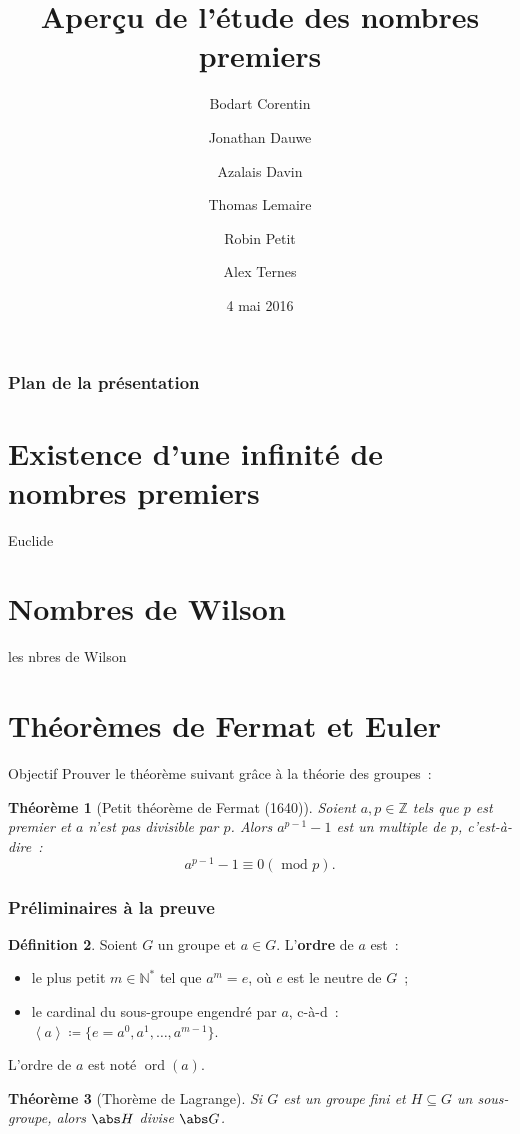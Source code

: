 \documentclass[10pt, mathserif]{beamer}
\title{Aperçu de l'étude des nombres premiers}
\author{Bodart Corentin %
	\and Jonathan Dauwe %
	\and Azalais Davin %
	\and Thomas Lemaire %
	\and Robin Petit %
	\and Alex Ternes}
\date{4 mai 2016}
\institute{Université Libre de Bruxelles}
\DeclareMathOperator{\ord}{ord}
\newcommand{\Z}{\mathbb Z}
\newcommand{\N}{\mathbb N}
\newcommand{\eng}[1]{\left\langle#1\right\rangle}
\renewcommand{\mod}{\mbox{ mod }}
\newtheorem{thm}{Théorème}[section]
\theoremstyle{definition}
\newtheorem{déf}[thm]{Définition}
\theoremstyle{remark}
\begin{document}
	\frame{\titlepage}

	\begin{frame}
		\frametitle{Plan de la présentation}
		\tableofcontents
	\end{frame}

\section{Existence d'une infinité de nombres premiers}
	\begin{frame}
		Euclide
	\end{frame}

\section{Nombres de Wilson}  %
	\begin{frame}
		les nbres de Wilson
	\end{frame}
	
	
\section{Théorèmes de Fermat et Euler}
	\begin{frame}
		\begin{block}{Objectif}
			Prouver le théorème suivant grâce à la théorie des groupes~:
		\end{block}

		\begin{thm}[Petit théorème de Fermat (1640)]
			Soient $a, p \in\Z$ tels que $p$ est premier et $a$ n'est pas divisible par $p$. Alors $a^{p-1} - 1$ est un multiple de $p$, c'est-à-dire~:
			\[a^{p-1}-1 \equiv 0 (\mod p).\]
		\end{thm}
	\end{frame}

	\begin{frame}
		\frametitle{Préliminaires à la preuve}
		\begin{déf}
			Soient $G$ un groupe et $a \in G$. L'\textbf{ordre} de $a$ est~:
			\begin{itemize}
				\item le plus petit $m \in \N^*$ tel que $a^m = e$, où $e$ est le neutre de $G$~;
				\item le cardinal du sous-groupe engendré par $a$, c-à-d~: $\eng a \coloneqq \{e = a^0, a^1, \dotsc, a^{m-1}\}$.
			\end{itemize}

			L'ordre de $a$ est noté $\ord(a)$.
		\end{déf}

		\begin{thm}[Thorème de Lagrange]
			Si $G$ est un groupe fini et $H \subseteq G$ un sous-groupe, alors $\abs H$ divise $\abs G$.
		\end{thm}
	\end{frame}
\end{document}
